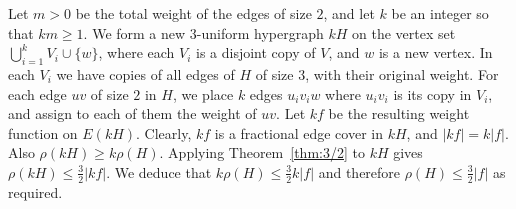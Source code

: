 \documentclass{article}
\theoremstyle{definition}
\begin{document}
Let $m > 0$ be the total weight of the edges of size $2$, and let $k$ be an integer so that $km \ge 1$. We form a new $3$-uniform hypergraph $kH$ on the vertex set $\bigcup _{i=1}^k V_i \cup \{w\}$, where each $V_i$ is a disjoint copy of $V$, and $w$ is a new vertex. In each $V_i$ we have copies of all edges of $H$ of size $3$, with their original weight. For each edge $uv$ of size $2$ in $H$, we place $k$ edges $u_iv_iw$ where $u_iv_i$ is its copy in $V_i$, and assign to each of them the weight of $uv$. Let $kf$ be the resulting weight function on $E(kH)$. Clearly, $kf$ is a fractional edge cover in $kH$, and $|kf| = k|f|$. Also $\rho(kH) \ge k\rho(H)$. Applying Theorem~\ref{thm:3/2} to $kH$ gives $\rho(kH) \le \frac{3}{2} |kf|$. We deduce that $k\rho(H) \le \frac{3}{2} k|f|$ and therefore $\rho(H) \le \frac{3}{2} |f|$ as required.
\end{document}
